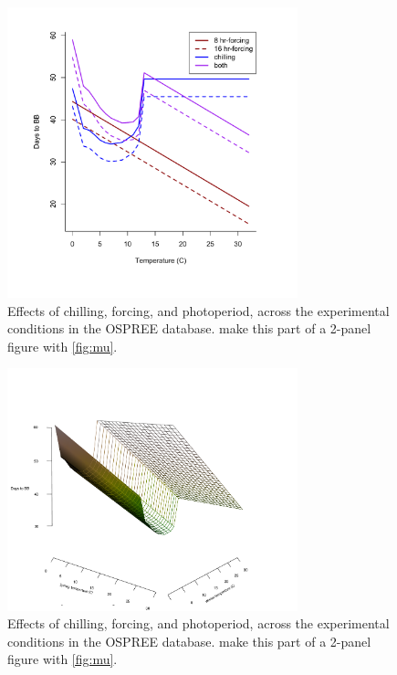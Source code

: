 \documentclass[11pt,letter]{article}
\begin{document}
\begin{figure}[h!]
\centering
\noindent \includegraphics[width=0.75\textwidth]{..//..//analyses/bb_analysis/figures/expcondi_forecastplot.pdf}
\caption{Effects of chilling, forcing, and photoperiod, across the experimental conditions in the OSPREE database. make this part of a 2-panel figure with \ref{fig:mu}.}
\label{fig:apc}
\end{figure}

\begin{figure}[h!]
\centering
\noindent \includegraphics[width=0.75\textwidth]{..//..//analyses/bb_analysis/figures/bbmod_3dplot_edited.pdf}
\caption{Effects of chilling, forcing, and photoperiod, across the experimental conditions in the OSPREE database. make this part of a 2-panel figure with \ref{fig:mu}.}
\label{fig:apc3d}
\end{figure}
\end{document}
